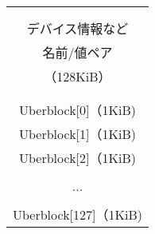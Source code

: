 \documentclass[border=1mm]{standalone}
\begin{document}
\begin{tabular}{|c|}\hline
                        \\
                        \\
  デバイス情報など      \\
  名前/値ペア           \\
  （128KiB）            \\
                        \\
                        \\\hline
  Uberblock[0]（1KiB)   \\\hline
  Uberblock[1]（1KiB)   \\\hline
  Uberblock[2]（1KiB)   \\\hline
                        \\
  ...                   \\
                        \\\hline
  Uberblock[127]（1KiB) \\\hline
\end{tabular}
\end{document}
